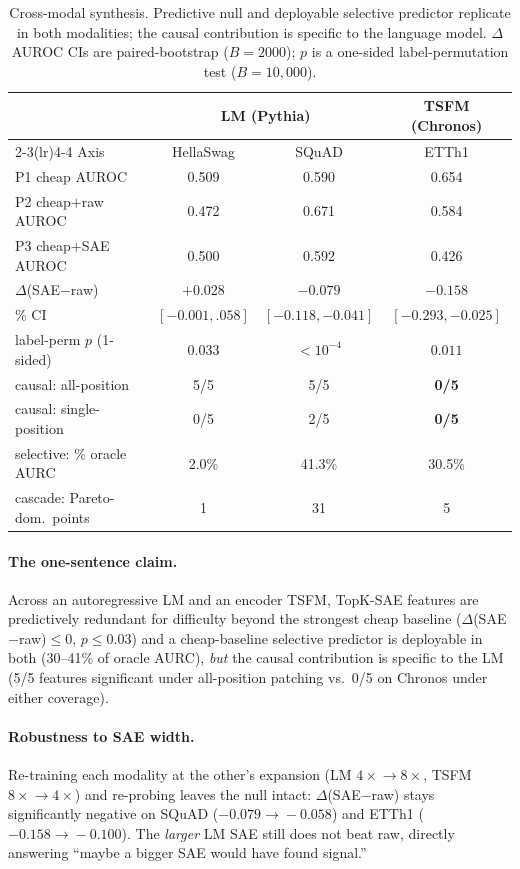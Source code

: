 \documentclass[11pt]{article}
\newcommand{\dauroc}{$\Delta$AUROC}
\newcommand{\sae}{SAE}
\begin{document}
\begin{table}[t]
\centering
\small
\caption{Cross-modal synthesis. Predictive null and deployable selective
predictor replicate in both modalities; the causal contribution is specific to
the language model. \dauroc{} CIs are paired-bootstrap ($B{=}2000$); $p$ is a
one-sided label-permutation test ($B{=}10{,}000$).}
\label{tab:synth}
\begin{tabular}{lccc}
\toprule
 & \multicolumn{2}{c}{\textbf{LM (Pythia)}} & \textbf{TSFM (Chronos)} \\
\cmidrule(lr){2-3}\cmidrule(lr){4-4}
Axis & HellaSwag & SQuAD & ETTh1 \\
\midrule
P1 cheap AUROC                 & 0.509 & 0.590 & 0.654 \\
P2 cheap$+$raw AUROC           & 0.472 & 0.671 & 0.584 \\
P3 cheap$+$\sae{} AUROC        & 0.500 & 0.592 & 0.426 \\
$\Delta$(\sae{}$-$raw)         & $+0.028$ & $-0.079$ & $-0.158$ \\
\quad 95\% CI                  & $[-0.001,.058]$ & $[-0.118,-0.041]$ & $[-0.293,-0.025]$ \\
label-perm $p$ (1-sided)       & $0.033$ & $<10^{-4}$ & $0.011$ \\
causal: all-position           & 5/5 & 5/5 & \textbf{0/5} \\
causal: single-position        & 0/5 & 2/5 & \textbf{0/5} \\
selective: \% oracle AURC      & 2.0\% & 41.3\% & 30.5\% \\
cascade: Pareto-dom.\ points   & 1 & 31 & 5 \\
\bottomrule
\end{tabular}
\end{table}

\paragraph{The one-sentence claim.}
Across an autoregressive LM and an encoder TSFM, TopK-\sae{} features are
predictively redundant for difficulty beyond the strongest cheap baseline
($\Delta$(\sae{}$-$raw)$\le0$, $p\le0.03$) and a cheap-baseline selective
predictor is deployable in both (30--41\% of oracle AURC), \emph{but} the causal
contribution is specific to the LM (5/5 features significant under all-position
patching vs.\ 0/5 on Chronos under either coverage).

\paragraph{Robustness to \sae{} width.}
Re-training each modality at the other's expansion (LM $4\times\!\to\!8\times$,
TSFM $8\times\!\to\!4\times$) and re-probing leaves the null intact:
$\Delta$(\sae{}$-$raw) stays significantly negative on SQuAD ($-0.079\!\to\!-0.058$)
and ETTh1 ($-0.158\!\to\!-0.100$). The \emph{larger} LM \sae{} still does not beat
raw, directly answering ``maybe a bigger \sae{} would have found signal.''
\end{document}
